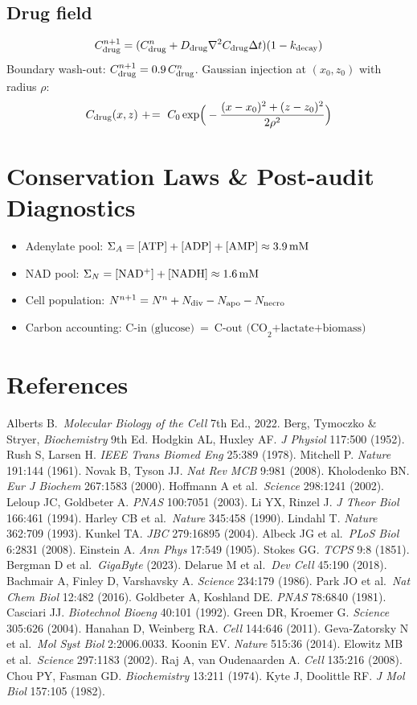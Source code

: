 \documentclass[11pt,a4paper]{article}
\newcommand{\eq}[1]{\begin{equation}#1\end{equation}}
\begin{document}
\subsection{Drug field}
\eq{ C_{\rm drug}^{n+1}=(C_{\rm drug}^n+D_{\rm drug}\nabla^2 C_{\rm drug}\Delta t)(1-k_{\rm decay}) }
Boundary wash-out: $C_{\rm drug}^{n+1}=0.9\,C_{\rm drug}^n$.
Gaussian injection at $(x_0,z_0)$ with radius $\rho$:
\eq{ C_{\rm drug}(x,z)\ +\!=\ C_0\exp\!\Big(-\frac{(x-x_0)^2+(z-z_0)^2}{2\rho^2}\Big) }

\clearpage
\section{Conservation Laws \& Post-audit Diagnostics}
\begin{itemize}
\item Adenylate pool: $\Sigma_A=[\rm ATP]+[\rm ADP]+[\rm AMP]\approx\SI{3.9}{mM}$
\item NAD pool: $\Sigma_N=[\rm NAD^+]+[\rm NADH]\approx\SI{1.6}{mM}$
\item Cell population: $N^{n+1}=N^n+N_{\rm div}-N_{\rm apo}-N_{\rm necro}$
\item Carbon accounting: $\text{C-in (glucose)}\ =\ \text{C-out (CO}_2\text{+lactate+biomass)}$
\end{itemize}

\section{References}
\footnotesize
Alberts B.\ \emph{Molecular Biology of the Cell} 7th Ed., 2022.\;
Berg, Tymoczko \& Stryer, \emph{Biochemistry} 9th Ed.\;
Hodgkin AL, Huxley AF. \emph{J Physiol} 117:500 (1952).\;
Rush S, Larsen H. \emph{IEEE Trans Biomed Eng} 25:389 (1978).\;
Mitchell P. \emph{Nature} 191:144 (1961).\;
Novak B, Tyson JJ. \emph{Nat Rev MCB} 9:981 (2008).\;
Kholodenko BN. \emph{Eur J Biochem} 267:1583 (2000).\;
Hoffmann A et al.\ \emph{Science} 298:1241 (2002).\;
Leloup JC, Goldbeter A. \emph{PNAS} 100:7051 (2003).\;
Li YX, Rinzel J. \emph{J Theor Biol} 166:461 (1994).\;
Harley CB et al.\ \emph{Nature} 345:458 (1990).\;
Lindahl T. \emph{Nature} 362:709 (1993).\;
Kunkel TA. \emph{JBC} 279:16895 (2004).\;
Albeck JG et al.\ \emph{PLoS Biol} 6:2831 (2008).\;
Einstein A. \emph{Ann Phys} 17:549 (1905).\;
Stokes GG. \emph{TCPS} 9:8 (1851).\;
Bergman D et al.\ \emph{GigaByte} (2023).\;
Delarue M et al.\ \emph{Dev Cell} 45:190 (2018).\;
Bachmair A, Finley D, Varshavsky A. \emph{Science} 234:179 (1986).\;
Park JO et al.\ \emph{Nat Chem Biol} 12:482 (2016).\;
Goldbeter A, Koshland DE. \emph{PNAS} 78:6840 (1981).\;
Casciari JJ. \emph{Biotechnol Bioeng} 40:101 (1992).\;
Green DR, Kroemer G. \emph{Science} 305:626 (2004).\;
Hanahan D, Weinberg RA. \emph{Cell} 144:646 (2011).\;
Geva-Zatorsky N et al.\ \emph{Mol Syst Biol} 2:2006.0033.\;
Koonin EV. \emph{Nature} 515:36 (2014).\;
Elowitz MB et al.\ \emph{Science} 297:1183 (2002).\;
Raj A, van Oudenaarden A. \emph{Cell} 135:216 (2008).\;
Chou PY, Fasman GD. \emph{Biochemistry} 13:211 (1974).\;
Kyte J, Doolittle RF. \emph{J Mol Biol} 157:105 (1982).
\end{document}
